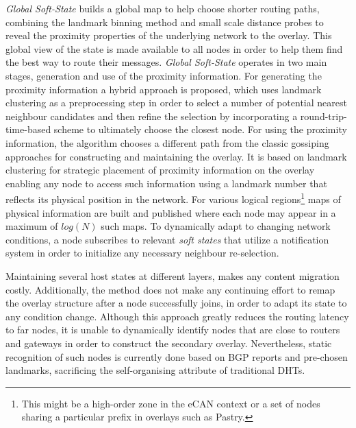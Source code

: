\textit{Global Soft-State} \cite{XTZ2003} builds a global map to help
choose shorter routing paths, combining the landmark binning method and small
scale distance probes to reveal the proximity properties of the underlying
network to the overlay. %
This global view of the
state is made available to all nodes in order to help them find the best way to
route their messages. \textit{Global Soft-State} operates in two main stages,
generation and use of the proximity information. For generating the proximity
information a hybrid approach is proposed, which uses landmark clustering as a
preprocessing step in order to select a number of potential nearest neighbour
candidates and then refine the selection by incorporating a
round-trip-time-based scheme to ultimately choose the closest node. For using
the proximity information, the algorithm chooses a different path from the
classic gossiping approaches for constructing and maintaining the overlay. It is
based on landmark clustering for strategic placement of proximity information on
the overlay enabling any node to access such information using a landmark number
that reflects its physical position in the network. For various logical
regions\footnote{This might be a high-order zone in the eCAN\cite{xu_ecan_2002}
context or a set of nodes sharing a particular prefix in overlays such as
Pastry.} maps of physical information are built and published where each node
may appear in a maximum of $log\left( N \right)$ such maps. To dynamically adapt
to changing network conditions, a node subscribes to relevant \emph{soft states}
that utilize a notification system in order to initialize any necessary
neighbour re-selection.

Maintaining several host states at different layers, makes any content migration
costly. Additionally, the method does not make any continuing effort to remap
the overlay structure after a node successfully joins, in order to adapt its
state to any condition change. Although this approach greatly reduces the
routing latency to far nodes, it is unable to dynamically identify nodes that
are close to routers and gateways in order to construct the secondary overlay.
Nevertheless, static recognition of such nodes is currently done based on BGP
reports and pre-chosen landmarks, sacrificing the self-organising attribute of
traditional DHTs.

